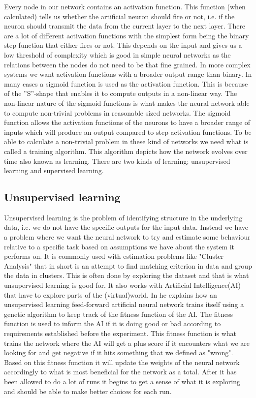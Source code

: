 Every node in our network contains an activation function. This function (when calculated) tells us whether the artificial neuron should fire or not, i.e. if the neuron should transmit the data from the current layer to the next layer. There are a lot of different activation functions with the simplest form being the binary step function that either fires or not. This depends on the input and gives us a low threshold of complexity which is good in simple neural networks as the relations between the nodes do not need to be that fine grained. In more complex systems we want activation functions with a broader output range than binary. In many cases a sigmoid function is used as the activation function. This is because of the ''S''-shape that enables it to compute outputs in a non-linear way. The non-linear nature of the sigmoid functions is what makes the neural network able to compute non-trivial problems in reasonable sized networks. The sigmoid function allows the activation functions of the neurons to have a broader range of inputs which will produce an output compared to step activation functions. To be able to calculate a non-trivial problem in these kind of networks we need what is called a training algorithm. This algorithm depicts how the network evolves over time also known as learning. There are two kinds of learning; unsupervised learning and supervised learning.

\subsection{Unsupervised learning}
Unsupervised learning is the problem of identifying structure in the underlying data, i.e. we do not have the specific outputs for the input data. Instead we have a problem where we want the neural network to try and estimate some behaviour relative to a specific task based on assumptions we have about the system it performs on. It is commonly used with estimation problems like "Cluster Analysis" that in short is an attempt to find matching criterion in data and group the data in clusters. This is often done by exploring the dataset and that is what unsupervised learning is good for. It also works with Artificial Intelligence(AI) that have to explore parts of the (virtual)world. In \cite{buckland2002ai} he explains how an unsupervised learning feed-forward artificial neural network trains itself using a genetic algorithm to keep track of the fitness function of the AI. The fitness function is used to inform the AI if it is doing good or bad according to requirements established before the experiment. This fitness function is what trains the network where the AI will get a plus score if it encounters what we are looking for and get negative if it hits something that we defined as "wrong". Based on this fitness function it will update the weights of the neural network accordingly to what is most beneficial for the network as a total. After it has been allowed to do a lot of runs it begins to get a sense of what it is exploring and should be able to make better choices for each run.

